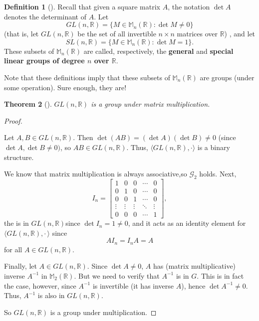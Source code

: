 \documentclass[10pt,]{book}
\newcommand{\terminology}[1]{\textbf{#1}}
\theoremstyle{plain}
\newtheorem{theorem}{Theorem}[section]
\theoremstyle{definition}
\newtheorem{definition}[theorem]{Definition}
\theoremstyle{definition}
\theoremstyle{definition}
\theoremstyle{definition}
\numberwithin{equation}{section}
\def\R{\mathbb{R}}
\def\M{\mathbb{M}}
\def\G{\mathcal{G}}
\newcommand{\amp}{&}
\begin{document}
\begin{definition}[{}]\label{definition-21}
\label{notation-32}
\label{notation-33}
Recall that given a square matrix \(A\), the notation \(\det A\) denotes the determinant of \(A\). Let%
\begin{equation*}
GL(n,\R)=\{M\in \M_n(\R):\det M \neq 0\}
\end{equation*}
(that is, let \(GL(n,\R)\) be  the set of all invertible \(n \times n\) matrices over \(\R\)) , and let%
\begin{equation*}
SL(n,\R)=\{M\in \M_n(\R):\det M =1\}\text{.}
\end{equation*}
These subsets of \(\M_n(\R)\) are called, respectively, the \terminology{general} and \terminology{special linear groups of degree \(n\) over \(\R\)}.%
\end{definition}
Note that these definitions imply that these subsets of \(\M_n(\R)\) are groups (under some operation). Sure enough, they are!%
\begin{theorem}[{}]\label{gl}
\label{notation-34}
 \(GL(n,\R)\) is a group under matrix multiplication.%
\end{theorem}
\begin{proof}\hypertarget{proof-7}{}
Let \(A,B\in GL(n, \R)\). Then \(\det(AB)=(\det A)(\det B) \neq 0\) (since \(\det A, \det B \neq 0)\), so \(AB\in GL(n,\R)\).  Thus, \(\langle GL(n,\R), \cdot\rangle\) is a binary structure.%
\par
We know that matrix multiplication is always associative,so \(\G_2\) holds. Next,%
\begin{equation*}
I_n= \begin{bmatrix}1 \amp  0 \amp  0 \amp  \cdots \amp  0 \\
0 \amp  1 \amp  0 \amp  \cdots \amp  0 \\
0 \amp  0 \amp  1 \amp  \cdots \amp  0 \\
\vdots \amp  \vdots \amp  \vdots \amp  \ddots \amp  \vdots \\
0 \amp  0 \amp  0 \amp  \cdots \amp  1
\end{bmatrix},
\end{equation*}
the  is in \(GL(n,\R)\)since \(\det I_n=1\neq 0\), and it acts as an identity element for \(\langle GL(n,\R), \cdot\,\rangle\) since%
\begin{equation*}
AI_n=I_nA = A
\end{equation*}
for all \(A\in GL(n,\R)\).%
\par
Finally, let \(A\in GL(n,\R)\).  Since \(\det A\neq 0\), \(A\) has (matrix multiplicative) inverse \(A^{-1}\) in \(\M_2(\R)\). But we need to verify that \(A^{-1}\) is in \(G\). This is in fact the case, however, since \(A^{-1}\) is invertible (it has inverse \(A\)), hence \(\det
A^{-1} \neq 0\).  Thus, \(A^{-1}\) is also in \(GL(n,\R)\).%
\par
So \(GL(n,\R)\) is a group under multiplication.%
\end{proof}
\end{document}
